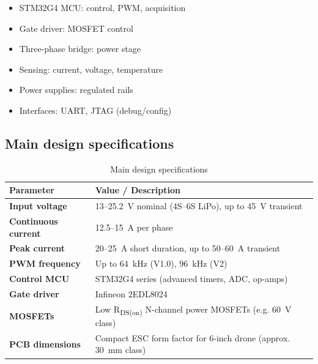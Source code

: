 \documentclass[11pt,a4paper]{article}
\begin{document}
\noindent
\begin{minipage}[t]{0.48\textwidth}
\begin{itemize}[noitemsep, topsep=0pt]
    \item STM32G4 MCU: control, PWM, acquisition
    \item Gate driver: MOSFET control
    \item Three-phase bridge: power stage
\end{itemize}
\end{minipage}
\hfill
\begin{minipage}[t]{0.48\textwidth}
\begin{itemize}[noitemsep, topsep=0pt]
    \item Sensing: current, voltage, temperature
    \item Power supplies: regulated rails
    \item Interfaces: UART, JTAG (debug/config)
\end{itemize}
\end{minipage}

\subsection{Main design specifications}

\begin{table}[H]
    \centering
    \caption{Main design specifications}
    \begin{tabularx}{\textwidth}{>{\bfseries}l X}
        \toprule
        Parameter & Value / Description \\
        \midrule
        Input voltage & 13--25.2~V nominal (4S--6S LiPo), up to 45~V transient \\
        Continuous current & 12.5--15~A per phase \\
        Peak current & 20--25~A short duration, up to 50--60~A transient \\
        PWM frequency & Up to 64~kHz (V1.0), 96~kHz (V2) \\
        Control MCU & STM32G4 series (advanced timers, ADC, op-amps) \\
        Gate driver & Infineon 2EDL8024 \\
        MOSFETs & Low R\textsubscript{DS(on)} N-channel power MOSFETs (e.g. 60~V class) \\
        PCB dimensions & Compact ESC form factor for 6-inch drone (approx. 30~mm class) \\
        \bottomrule
    \end{tabularx}
    \label{tab:specs}
\end{table}
\end{document}
